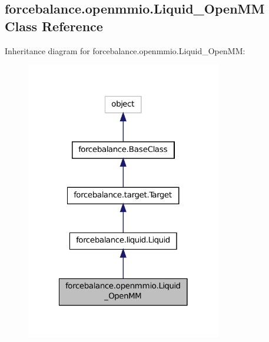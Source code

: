 \hypertarget{classforcebalance_1_1openmmio_1_1Liquid__OpenMM}{\subsection{forcebalance.\-openmmio.\-Liquid\-\_\-\-Open\-M\-M Class Reference}
\label{classforcebalance_1_1openmmio_1_1Liquid__OpenMM}
}


Inheritance diagram for forcebalance.\-openmmio.\-Liquid\-\_\-\-Open\-M\-M\-:
\nopagebreak
\begin{figure}[H]
\begin{center}
\leavevmode
\includegraphics[width=242pt]{classforcebalance_1_1openmmio_1_1Liquid__OpenMM__inherit__graph}
\end{center}
\end{figure}


